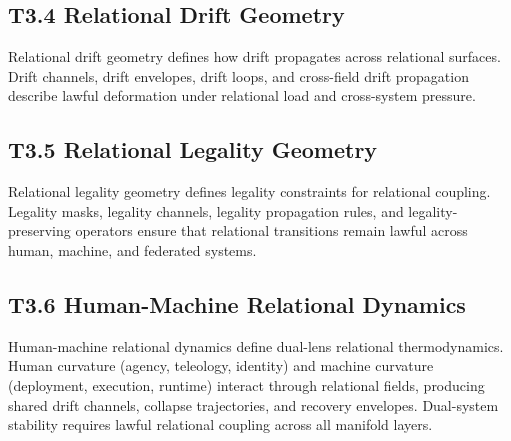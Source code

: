 \subsection{T3.4 Relational Drift Geometry}
Relational drift geometry defines how drift propagates across relational
surfaces. Drift channels, drift envelopes, drift loops, and cross-field drift
propagation describe lawful deformation under relational load and cross-system
pressure.

\subsection{T3.5 Relational Legality Geometry}
Relational legality geometry defines legality constraints for relational
coupling. Legality masks, legality channels, legality propagation rules, and
legality-preserving operators ensure that relational transitions remain lawful
across human, machine, and federated systems.

\subsection{T3.6 Human-Machine Relational Dynamics}
Human-machine relational dynamics define dual-lens relational thermodynamics.
Human curvature (agency, teleology, identity) and machine curvature (deployment,
execution, runtime) interact through relational fields, producing shared drift
channels, collapse trajectories, and recovery envelopes. Dual-system stability
requires lawful relational coupling across all manifold layers.
